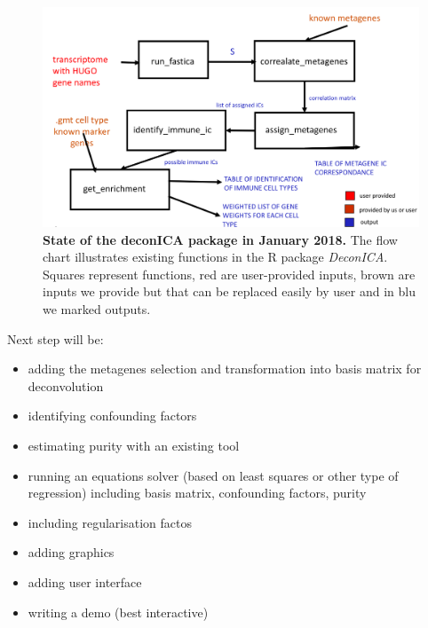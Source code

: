 \documentclass[12pt,]{book}
\providecommand{\tightlist}{%
  \setlength{\itemsep}{0pt}\setlength{\parskip}{0pt}}
\theoremstyle{definition}
\theoremstyle{definition}
\theoremstyle{definition}
\theoremstyle{remark}
\begin{document}
\begin{figure}

{\centering \includegraphics[width=1\linewidth]{figures-ext/deconICApipeline} 

}

\caption{\textbf{State of the deconICA package in
January 2018.} The flow chart illustrates existing functions in the R
package \emph{DeconICA}. Squares represent functions, red are
user-provided inputs, brown are inputs we provide but that can be
replaced easily by user and in blu we marked outputs.}\label{fig:deconICAflow}
\end{figure}







Next step will be:

\begin{itemize}
\tightlist
\item
  adding the metagenes selection and transformation into basis matrix
  for deconvolution
\item
  identifying confounding factors
\item
  estimating purity with an existing tool
\item
  running an equations solver (based on least squares or other type of
  regression) including basis matrix, confounding factors, purity
\item
  including regularisation factos
\item
  adding graphics
\item
  adding user interface
\item
  writing a demo (best interactive)
\end{itemize}

\newpage
\end{document}
